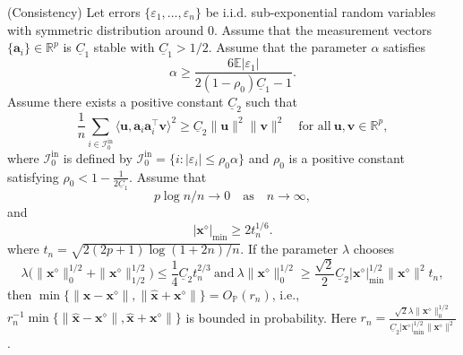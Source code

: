 \documentclass[10pt,a4paper]{amsart}
\begin{document}
\begin{theorem}\label{consistency}(Consistency) Let errors $\{\varepsilon_1,\ldots,\varepsilon_n\}$ be i.i.d. sub-exponential random variables with symmetric distribution around 0. Assume that the measurement vectors $\{\mathbf{a}_i\}\in\mathbb{R}^p$ is $\underline{C}_1$ stable with $\underline{C}_1>1/2$.  Assume that the parameter $\alpha$ satisfies \begin{equation}\label{cond-alpha-consistency}
		\alpha\geq\frac{6\mathbb{E}|\varepsilon_1|}{2(1-\rho_0)\underline{C}_1-1}.
	\end{equation}
	Assume there exists a positive constant $\underline{C}_2$ such that
	\begin{equation}\label{cond-ai-c2}
		\frac{1}{n}\sum_{i\in\mathcal{I}_{0}^{\mathrm{in}}}\langle \mathbf{u}, \mathbf{a}_i\mathbf{a}_i^\top\mathbf{v}\rangle^2\geq\underline{C}_2\|\mathbf{u}\| ^2\|\mathbf{v}\| ^2
		\quad \text{for all} ~\mathbf{u}, \mathbf{v}\in\mathbb{R}^p,
	\end{equation}
	where $\mathcal{I}_{0}^{\mathrm{in}}$ is defined by $\mathcal{I}_{0}^{\mathrm{in}}=\{i: |\varepsilon_i|\leq\rho_0\alpha\}$ and 
	$\rho_0$ is a positive constant satisfying $\rho_0<1-\frac{1}{2\underline{C}_1}$.
 Assume that \begin{equation}\label{cond-np-consistency} p\log n/n\to0 \quad\mbox{as}\quad n\to\infty,\end{equation}
 and \begin{equation}\label{cond-true-min}
 	|\mathbf{x}^\diamond|_{\mathrm{min}}\geq 2t_n^{1/6}.
 \end{equation} 
where $t_n=\sqrt{2(2p+1)\log(1+2n)/n}$. 
If the parameter $\lambda$ chooses \begin{equation}\label{cond-lambda-consistency}\lambda\big(\|\mathbf{x}^\diamond\|_{0}^{1/2}+\|\mathbf{x}^\diamond\|_{1/2}^{1/2}\big)
	\leq\frac{1}{4}\underline{C}_2t_n^{2/3}~\mbox{and}
	~\lambda\|\mathbf{x}^\diamond\|_0^{1/2}\geq \frac{\sqrt{2}}{2}\underline{C}_2|\mathbf{x}^\diamond|_{\mathrm{min}}^{1/2}\|\mathbf{x}^\diamond\|^2t_n,\end{equation} 
  then 
	$\min\{\|\hat{\mathbf{x}}-\mathbf{x}^\diamond\|, \|\hat{\mathbf{x}}+\mathbf{x}^\diamond\|\}=O_{\mathbb{P}}(r_n)$, i.e., $r_n^{-1}\min\{\|\hat{\mathbf{x}}-\mathbf{x}^\diamond\|, \hat{\mathbf{x}}+\mathbf{x}^\diamond\|\}$ is bounded in probability. Here $r_{n}=\frac{\sqrt{2}\lambda\|\mathbf{x}^\diamond\|_0^{1/2}}{\underline{C}_2|\mathbf{x}^\diamond|_{\mathrm{min}}^{1/2}\|\mathbf{x}^\diamond\|^2}$.
\end{theorem}
\end{document}

